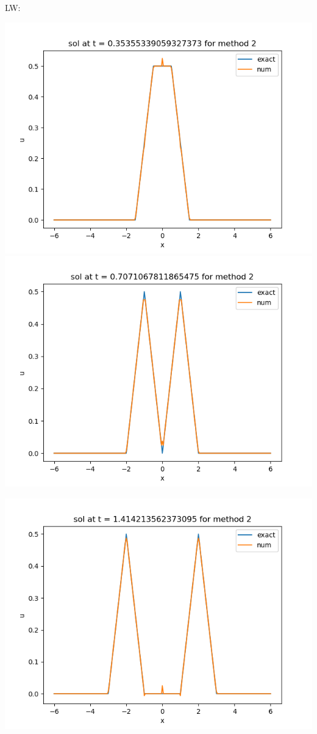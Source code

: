\documentclass{article}
\begin{document}
\begin{enumerate}
\begin{enumerate}
	LW:
	\begin{center}
		\includegraphics[scale=.32]{hw11 sol n = 10 method 2}
		\includegraphics[scale=.32]{hw11 sol n = 20 method 2}
	\end{center}
	\begin{center}
		\includegraphics[scale=.32]{hw11 sol n = 40 method 2}

\end{center}
\end{enumerate}
\end{enumerate}
\end{document}
